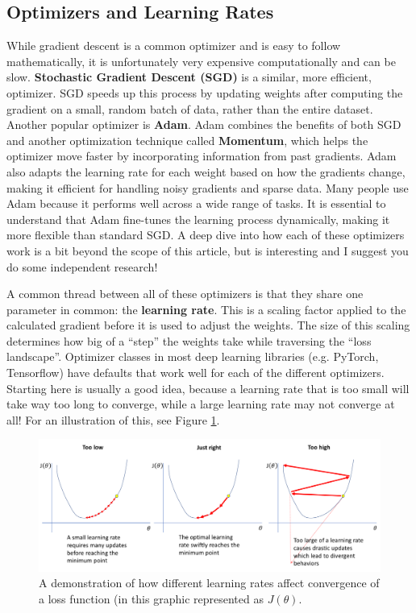 \subsection{Optimizers and Learning Rates}
\begin{flushleft}
    \large While gradient descent is a common optimizer and is easy to follow mathematically, it is unfortunately very expensive computationally and can be slow. \textbf{Stochastic Gradient Descent (SGD)} is a similar, more efficient, optimizer. SGD speeds up this process by updating weights after computing the gradient on a small, random batch of data, rather than the entire dataset. Another popular optimizer is \textbf{Adam}. Adam combines the benefits of both SGD and another optimization technique called \textbf{Momentum}, which helps the optimizer move faster by incorporating information from past gradients. Adam also adapts the learning rate for each weight based on how the gradients change, making it efficient for handling noisy gradients and sparse data. Many people use Adam because it performs well across a wide range of tasks. It is essential to understand that Adam fine-tunes the learning process dynamically, making it more flexible than standard SGD. A deep dive into how each of these optimizers work is a bit beyond the scope of this article, but is interesting and I suggest you do some independent research! \break
    
    A common thread between all of these optimizers is that they share one parameter in common: the \textbf{learning rate}. This is a scaling factor applied to the calculated gradient before it is used to adjust the weights. The size of this scaling determines how big of a ``step'' the weights take while traversing the ``loss landscape''. Optimizer classes in most deep learning libraries (e.g. PyTorch, Tensorflow) have defaults that work well for each of the different optimizers. Starting here is usually a good idea, because a learning rate that is too small will take way too long to converge, while a large learning rate may not converge at all! For an illustration of this, see Figure \ref{fig:lr}.

    \begin{figure}[H]
        \centering
        \includegraphics[width=1\linewidth]{dl/lr.png}
        \caption{A demonstration of how different learning rates affect convergence of a loss function (in this graphic represented as $J(\theta).$}
        \label{fig:lr}
    \end{figure}
\end{flushleft}

